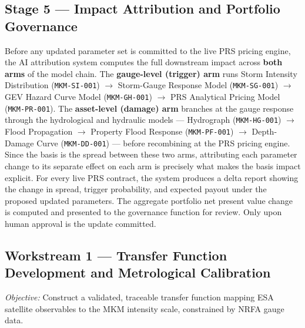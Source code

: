 \documentclass[11pt,a4paper]{article}
\begin{document}
\subsection{Stage 5 --- Impact Attribution and Portfolio Governance}

Before any updated parameter set is committed to the live PRS pricing engine, the
AI attribution system computes the full downstream impact across \textbf{both arms}
of the model chain. The \textbf{gauge-level (trigger) arm} runs Storm Intensity
Distribution (\texttt{MKM-SI-001}) $\rightarrow$ Storm-Gauge Response Model
(\texttt{MKM-SG-001}) $\rightarrow$ GEV Hazard Curve Model (\texttt{MKM-GH-001})
$\rightarrow$ PRS Analytical Pricing Model (\texttt{MKM-PR-001}). The
\textbf{asset-level (damage) arm} branches at the gauge response through the
hydrological and hydraulic models --- Hydrograph (\texttt{MKM-HG-001})
$\rightarrow$ Flood Propagation $\rightarrow$ Property Flood Response
(\texttt{MKM-PF-001}) $\rightarrow$ Depth-Damage Curve (\texttt{MKM-DD-001}) ---
before recombining at the PRS pricing engine. Since the basis is the spread between
these two arms, attributing each parameter change to its separate effect on each
arm is precisely what makes the basis impact explicit. For every live PRS
contract, the system produces a delta report showing the change in spread, trigger
probability, and expected payout under the proposed updated parameters. The
aggregate portfolio net present value change is computed and presented to the
governance function for review. Only upon human approval is the update committed.

\mkmimplementation

\subsection{Workstream 1 --- Transfer Function Development and Metrological
Calibration}

\textit{Objective:} Construct a validated, traceable transfer function mapping ESA
satellite observables to the MKM intensity scale, constrained by NRFA gauge data.
\end{document}
